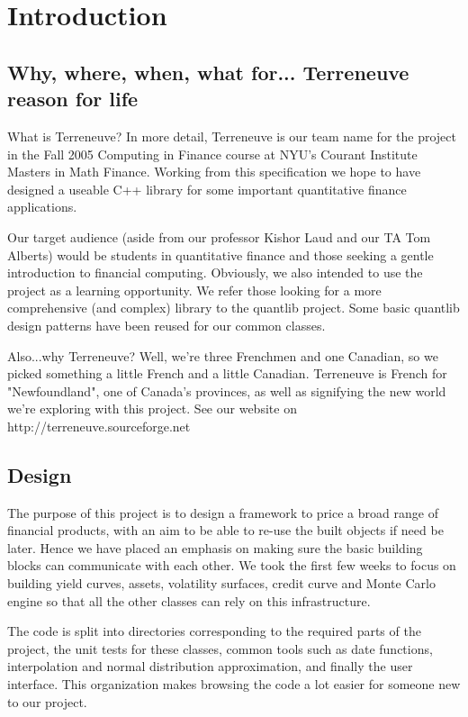 \chapter{Introduction}

\section{Why, where, when, what for... Terreneuve reason for life}

What is Terreneuve? In more detail, Terreneuve is our team name for the project in the Fall 2005 Computing in Finance course at NYU's Courant Institute Masters in Math Finance. Working from this specification we hope to have designed a useable C++ library for some important quantitative finance applications.

Our target audience (aside from our professor Kishor Laud and our TA Tom Alberts) would be students in quantitative finance and those seeking a gentle introduction to financial computing. Obviously, we also intended to use the project as a learning opportunity. We refer those looking for a more comprehensive (and complex) library to the quantlib project.  Some basic quantlib design patterns have been reused for our common classes.

Also...why Terreneuve? Well, we're three Frenchmen and one Canadian, so we picked something a little French and a little Canadian. Terreneuve is French for "Newfoundland", one of Canada's provinces, as well as signifying the new world we're exploring with this project. See our website on http://terreneuve.sourceforge.net

\section{Design }

The purpose of this project is to design a framework to price a broad range of financial products, with an aim to be able to re-use the built objects if need be later. Hence we have placed an emphasis on making sure the basic building blocks can communicate with each other. We took the first few weeks to focus on building yield curves, assets, volatility surfaces, credit curve and Monte Carlo engine so that all the other classes can rely on this infrastructure.

The code is split into directories corresponding to the required parts of the project, the unit tests for these classes, common tools such as date functions, interpolation and normal distribution approximation, and finally the user interface. This organization makes browsing the code a lot easier for someone new to our project.

